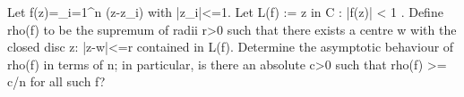 Let f(z)=\prod_{i=1}^n (z-z_i) with |z_i|<=1. Let
  L(f) := { z in C : |f(z)| < 1 }.
Define rho(f) to be the supremum of radii r>0 such that there exists a centre w with the closed disc {z: |z-w|<=r} contained in L(f).
Determine the asymptotic behaviour of rho(f) in terms of n; in particular, is there an absolute c>0 such that rho(f) >= c/n for all such f?
